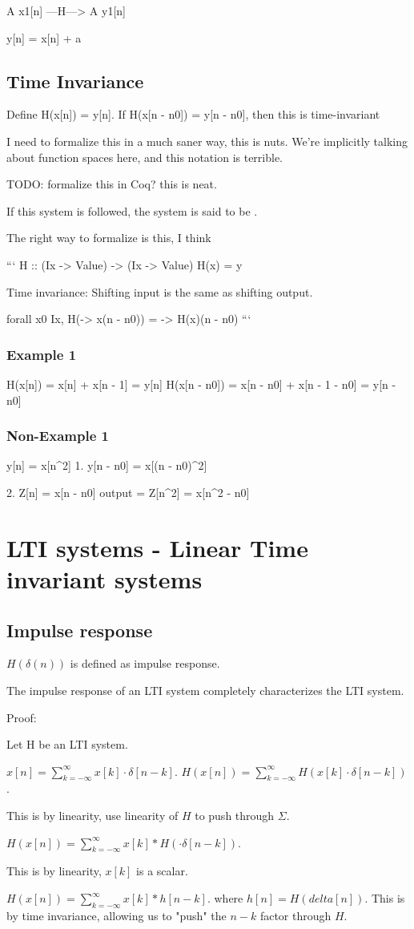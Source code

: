 \documentclass{article}
\begin{document}
A x1[n] ---H---> A y1[n]

y[n] = x[n] + a


\subsection{Time Invariance}

Define H(x[n]) = y[n].
If H(x[n - n0]) = y[n - n0], then this is time-invariant

I need to formalize this in a much saner way, this is nuts. We're implicitly
talking about function spaces here, and this notation is terrible.

TODO: formalize this in Coq? this is neat.

If this system is followed, the system is said to be .

The right way to formalize is this, I think

```
H :: (Ix -> Value) -> (Ix -> Value)
H(x) = y

Time invariance:
Shifting input is the same as shifting output.

forall x0 \in Ix, H(\n -> x(n - n0)) = \n -> H(x)(n - n0)
```

\subsubsection{Example 1}
H(x[n]) = x[n] + x[n - 1] = y[n]
H(x[n - n0]) = x[n - n0] + x[n - 1 - n0] = y[n - n0]

\subsubsection{Non-Example 1}
y[n] = x[n^2]
1. y[n - n0] = x[(n - n0)^2]

2. Z[n] = x[n - n0]
   output = Z[n^2] = x[n^2 - n0]

\section{LTI systems - Linear Time invariant systems}
\subsection{Impulse response}

$H(\delta(n))$ is defined as impulse response.

The impulse response of an LTI system completely characterizes the LTI system.

Proof:

Let H be an LTI system.

$x[n] = \sum_{k=-\infty}^{\infty} x[k] \cdot \delta[n - k]$.
$H(x[n]) = \sum_{k=-\infty}^{\infty} H(x[k] \cdot \delta[n - k])$.

This is by linearity, use linearity of $H$ to push through $\Sigma$.


$H(x[n]) = \sum_{k=-\infty}^{\infty} x[k] * H(\cdot \delta[n - k])$.

This is by linearity, $x[k]$ is a scalar.


$H(x[n]) = \sum_{k=-\infty}^{\infty} x[k] * h[n - k]$.
where $h[n] = H(delta[n])$.  This is by time invariance, allowing us to "push" the
$n - k$ factor through $H$.
\end{document}
